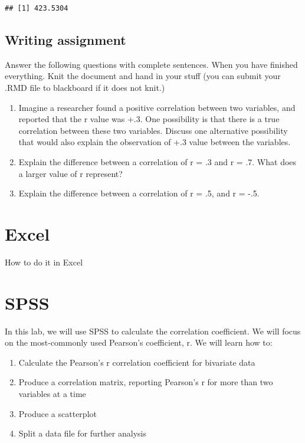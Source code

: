 \documentclass[
]{book}
\providecommand{\tightlist}{%
  \setlength{\itemsep}{0pt}\setlength{\parskip}{0pt}}
\begin{document}
\begin{verbatim}
## [1] 423.5304
\end{verbatim}

\hypertarget{writing-assignment-2}{%
\subsection{Writing assignment}\label{writing-assignment-2}}

Answer the following questions with complete sentences. When you have finished everything. Knit the document and hand in your stuff (you can submit your .RMD file to blackboard if it does not knit.)

\begin{enumerate}
\def\labelenumi{\arabic{enumi}.}
\item
  Imagine a researcher found a positive correlation between two variables, and reported that the r value was +.3. One possibility is that there is a true correlation between these two variables. Discuss one alternative possibility that would also explain the observation of +.3 value between the variables.
\item
  Explain the difference between a correlation of r = .3 and r = .7. What does a larger value of r represent?
\item
  Explain the difference between a correlation of r = .5, and r = -.5.
\end{enumerate}

\hypertarget{excel-3}{%
\section{Excel}\label{excel-3}}

How to do it in Excel

\hypertarget{spss-3}{%
\section{SPSS}\label{spss-3}}

In this lab, we will use SPSS to calculate the correlation coefficient. We will focus on the most-commonly used Pearson's coefficient, r. We will learn how to:

\begin{enumerate}
\def\labelenumi{\arabic{enumi}.}
\tightlist
\item
  Calculate the Pearson's r correlation coefficient for bivariate data
\item
  Produce a correlation matrix, reporting Pearson's r for more than two variables at a time
\item
  Produce a scatterplot
\item
  Split a data file for further analysis
\end{enumerate}
\end{document}
